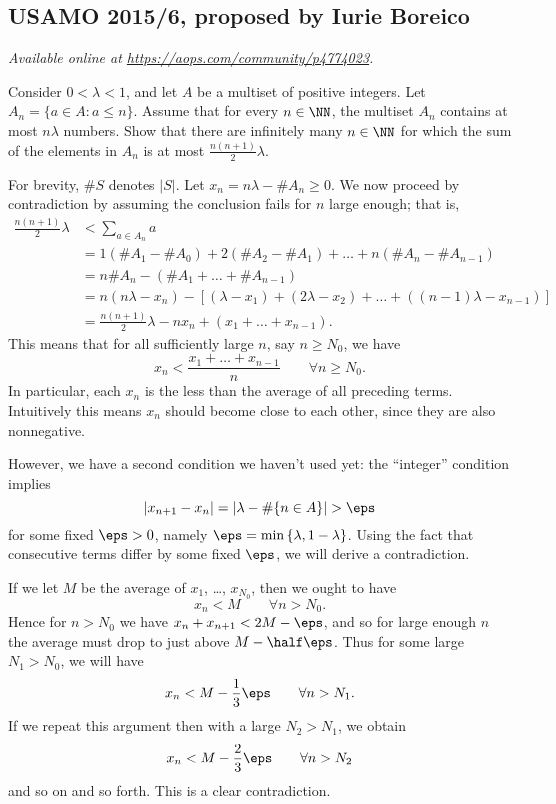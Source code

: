 \documentclass[11pt]{scrartcl}
\begin{document}
\subsection{USAMO 2015/6, proposed by Iurie Boreico}
\textsl{Available online at \url{https://aops.com/community/p4774023}.}
\begin{mdframed}[style=mdpurplebox,frametitle={Problem statement}]
Consider $0<\lambda<1$, and let $A$ be a multiset of positive integers.
Let $A_n=\{a\in A: a\leq n\}$.
Assume that for every $n\in\NN$,
the multiset $A_n$ contains at most $n\lambda$ numbers.
Show that there are infinitely many $n\in\NN$ for
which the sum of the elements in $A_n$ is
at most $\frac{n(n+1)}{2}\lambda$.
\end{mdframed}
For brevity, $\#S$ denotes $|S|$.
Let $x_n = n\lambda - \#A_n \ge 0$.
We now proceed by contradiction by assuming
the conclusion fails for $n$ large enough; that is,
\begin{align*}
  \frac{n(n+1)}{2}\lambda
  &< \sum_{a \in A_n} a \\
  &= 1(\#A_1-\#A_0)
  + 2(\#A_2 - \#A_1)
  + \dots + n(\#A_n - \#A_{n-1}) \\
  &= n \# A_n - (\# A_1 + \dots + \# A_{n-1}) \\
  &= n(n \lambda - x_n) - \left[ (\lambda - x_1)
    + (2\lambda - x_2) + \dots + ((n-1)\lambda - x_{n-1}) \right] \\
  &= \frac{n(n+1)}{2} \lambda - n x_n
  + (x_1 + \dots + x_{n-1}).
\end{align*}
This means that for all sufficiently large $n$, say $n \ge N_0$, we have
\[ x_{n} < \frac{x_1 + \dots + x_{n-1}}{n}
  \qquad \forall n \ge N_0. \]
In particular, each $x_n$ is the less
than the average of all preceding terms.
Intuitively this means $x_n$ should become close to each other,
since they are also nonnegative.

However, we have a second condition we haven't used yet:
the ``integer'' condition implies
\[
  \left\lvert x_{n+1} - x_n \right\rvert
  = \left\lvert \lambda - \#\{n \in A \} \right\rvert
  > \eps
\]
for some fixed $\eps > 0$,
namely $\eps = \min \left\{ \lambda, 1 - \lambda \right\}$.
Using the fact that consecutive terms differ by some fixed $\eps$,
we will derive a contradiction.

If we let $M$ be the average of $x_1$, \dots, $x_{N_0}$,
then we ought to have
\[ x_n < M \qquad \forall n > N_0. \]
Hence for $n > N_0$ we have $x_n + x_{n+1} < 2M - \eps$,
and so for large enough $n$ the average
must drop to just above $M - \half \eps$.
Thus for some large $N_1 > N_0$, we will have
\[ x_n < M - \frac13 \eps \qquad \forall n > N_1. \]
If we repeat this argument then with a large $N_2 > N_1$, we obtain
\[ x_n < M - \frac23 \eps \qquad \forall n > N_2 \]
and so on and so forth.
This is a clear contradiction.
\end{document}
